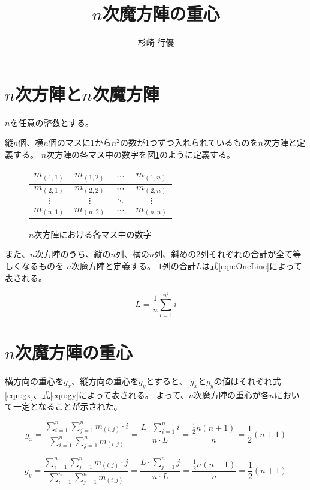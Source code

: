\documentclass[a4paper]{jsarticle}
\title{$n$次魔方陣の重心}
\author{杉崎 行優}
\date{}
\begin{document}
\maketitle
{}

\thispagestyle{empty}

\section{$n$次方陣と$n$次魔方陣}

$n$を任意の整数とする。

縦$n$個、横$n$個のマスに$1$から$n^2$の数が$1$つずつ入れられているものを$n$次方陣と定義する。
$n$次方陣の各マス中の数字を図\ref{tab:square}のように定義する。

\begin{figure}[htb]
\begin{center}
\begin{tabular}{|c|c|c|c|}
\hline
$m_{(1,1)}$ & $m_{(1,2)}$ & $\cdots$ & $m_{(1,n)}$ \\\hline
$m_{(2,1)}$ & $m_{(2,2)}$ & $\cdots$ & $m_{(2,n)}$ \\\hline
$\vdots$ & $\vdots$ & $\ddots$ & $\vdots$ \\\hline
$m_{(n,1)}$ & $m_{(n,2)}$ & $\cdots$ & $m_{(n,n)}$ \\\hline
\end{tabular}
\end{center}
\caption{$n$次方陣における各マス中の数字}
\label{tab:square}
\end{figure}

また、$n$次方陣のうち、縦の$n$列、横の$n$列、斜めの$2$列それぞれの合計が全て等しくなるものを
$n$次魔方陣と定義する。
$1$列の合計$L$は式\ref{eqn:OneLine}によって表される。

\begin{equation}
L=\frac{1}{n}\sum_{i=1}^{n^2}i
\label{eqn:OneLine}
\end{equation}

\section{$n$次魔方陣の重心}

横方向の重心を$g_x$、縦方向の重心を$g_y$とすると、
$g_x$と$g_y$の値はそれぞれ式\ref{eqn:gx}、式\ref{eqn:gy}によって表される。
よって、$n$次魔方陣の重心が各$n$において一定となることが示された。

\begin{equation} \label{eqn:gx}
\displaystyle
g_x = \frac{\displaystyle \sum_{i=1}^n \sum_{j=1}^n m_{(i,j)} \cdot i}{\displaystyle \sum_{i=1}^n \sum_{j=1}^n m_{(i,j)}}
=\frac{\displaystyle L \cdot \sum_{i=1}^n i}{n \cdot L}
=\frac{\displaystyle \frac{1}{2} n (n+1)}{n}
=\frac{1}{2} (n+1)
\end{equation}

\begin{equation} \label{eqn:gy}
\displaystyle
g_y = \frac{\displaystyle \sum_{i=1}^n \sum_{j=1}^n m_{(i,j)} \cdot j}{\displaystyle \sum_{i=1}^n \sum_{j=1}^n m_{(i,j)}}
=\frac{\displaystyle L \cdot \sum_{j=1}^n j}{n \cdot L}
=\frac{\displaystyle \frac{1}{2} n (n+1)}{n}
=\frac{1}{2} (n+1)
\end{equation}
\end{document}
